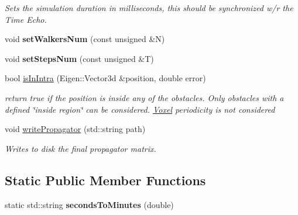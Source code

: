 \begin{DoxyCompactItemize}
\begin{DoxyCompactList}\small\item\em Sets the simulation duration in milliseconds, this should be synchronized w/r the Time Echo. \end{DoxyCompactList}\item 
\mbox{\label{class_dynamics_simulation_a25b78b4ef659a448a806b995a19cf8b1}} 
void {\bfseries set\+Walkers\+Num} (const unsigned \&N)
\item 
\mbox{\label{class_dynamics_simulation_a45248ef6170eaf8a3a62b43f3ce77e02}} 
void {\bfseries set\+Steps\+Num} (const unsigned \&T)
\item 
bool \hyperlink{class_dynamics_simulation_a15dfd0453397c12e932bfd29cf36ba74}{is\+In\+Intra} (Eigen\+::\+Vector3d \&position, double error)
\begin{DoxyCompactList}\small\item\em return true if the position is inside any of the obstacles. Only obstacles with a defined \char`\"{}inside region\char`\"{} can be considered. \hyperlink{class_voxel}{Voxel} periodicity is not considered \end{DoxyCompactList}\item 
\mbox{\label{class_dynamics_simulation_aeae993217cebb5c23f68cb3e04cf8e49}} 
void \hyperlink{class_dynamics_simulation_aeae993217cebb5c23f68cb3e04cf8e49}{write\+Propagator} (std\+::string path)
\begin{DoxyCompactList}\small\item\em Writes to disk the final propagator matrix. \end{DoxyCompactList}\end{DoxyCompactItemize}
\subsection*{Static Public Member Functions}
\begin{DoxyCompactItemize}
\item 
\mbox{\label{class_dynamics_simulation_abe4af37db2602b6341b2d7732e43951e}} 
static std\+::string {\bfseries seconds\+To\+Minutes} (double)
\end{DoxyCompactItemize}
